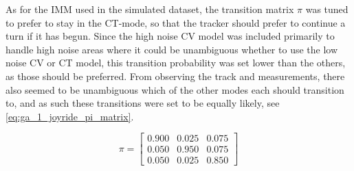 As for the IMM used in the simulated dataset, the transition matrix $\pi$ was tuned to prefer to stay in the CT-mode, so that the tracker should prefer to continue a turn if it has begun. Since the high noise CV model was included primarily to handle high noise areas where it could be unambiguous whether to use the low noise CV or CT model, this transition probability was set lower than the others, as those should be preferred. From observing the track and measurements, there also seemed to be unambiguous which of the other modes each should transition to, and as such these transitions were set to be equally likely, see \cref{eq:ga_1_joyride_pi_matrix}. 

\begin{equation}
    \label{eq:ga_1_joyride_pi_matrix}
    \pi = \begin{bmatrix}
        0.900 & 0.025 & 0.075 \\
        0.050 & 0.950 & 0.075 \\
        0.050 & 0.025 & 0.850 
    \end{bmatrix}
\end{equation}






